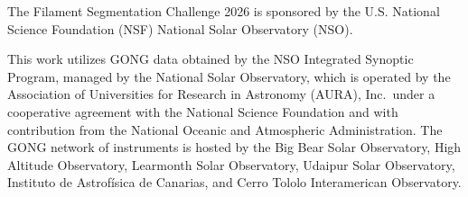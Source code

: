 \documentclass[sigconf,pbalance]{acmart}
\begin{document}
    The Filament Segmentation Challenge 2026 is sponsored by the U.S. National Science Foundation (NSF) National Solar Observatory (NSO).

    This work utilizes GONG data obtained by the NSO Integrated Synoptic Program, managed by the National Solar Observatory, which is operated by the Association of Universities for Research in Astronomy (AURA), Inc.\ under a cooperative agreement with the National Science Foundation and with contribution from the National Oceanic and Atmospheric Administration. The GONG network of instruments is hosted by the Big Bear Solar Observatory, High Altitude Observatory, Learmonth Solar Observatory, Udaipur Solar Observatory, Instituto de Astrofísica de Canarias, and Cerro Tololo Interamerican Observatory.



\end{document}
